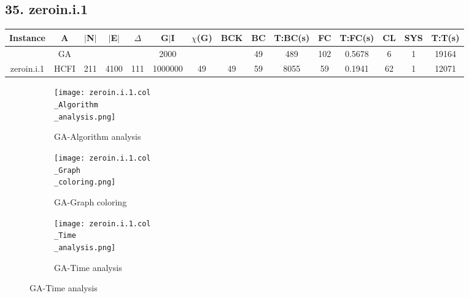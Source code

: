 \documentclass[10pt]{article}
\begin{document}
\subsection*{\hspace{0,9073976cm} 35. zeroin.i.1 }
\begin{table}[H]
\centering
\begin{tabular}{|c|c|c|c|c|c|c|c|c|c|c|c|c|c|c|}
\hline
Instance& A &$|$N$|$ & $|$E$|$ & $\Delta$ & G$|$I & $\chi$(G) &BCK&BC & T:BC(s) & FC & T:FC(s) & CL & SYS & T:T(s) \\ \hline \hline

	&GA&       &                   &                     &  2000       &     \cellcolor{yellow} & {\cellcolor{yellow}}& {{\cellcolor{green}49}}
&489   &102        &0.5678                   &6                    &1          &19164        \\ \cline{2-2} \cline{6-6} \cline{9-15}
 \multirow{-2}{*}{zeroin.i.1} &HCFI   &\multirow{-2}{*}{211}   &\multirow{-2}{*}{4100}     &\multirow{-2}{*}{111}     &1000000     &\multirow{-2}{*}{\cellcolor{yellow}49}      & \multirow{-2}{*}{\cellcolor{yellow}49}    &{\cellcolor{green}59}     &8055         & 59   &0.1941          &62    &1     &12071        \\ \hline 
\end{tabular}
\end{table}
\graphicspath{{./Core1/Solutions/GA/zeroin.i.1.col}}
\begin{figure}[H]
\begin{subfigure}{.33\textwidth}
  \centering
  \texttt{[image: zeroin.i.1.col\\\_Algorithm\\\_analysis.png]}
  \caption{GA-Algorithm analysis}
   \label{fig:subfig1}
\end{subfigure}%
\begin{subfigure}{.33\textwidth}
  \centering
  \texttt{[image: zeroin.i.1.col\\\_Graph\\\_coloring.png]}
  \caption{GA-Graph coloring}
  \label{fig:subfig2}
\end{subfigure}
\begin{subfigure}{.33\textwidth}
  \centering
  \texttt{[image: zeroin.i.1.col\\\_Time\\\_analysis.png]}
  \caption{GA-Time analysis}
  \end{subfigure}
\end{figure}
\end{document}
